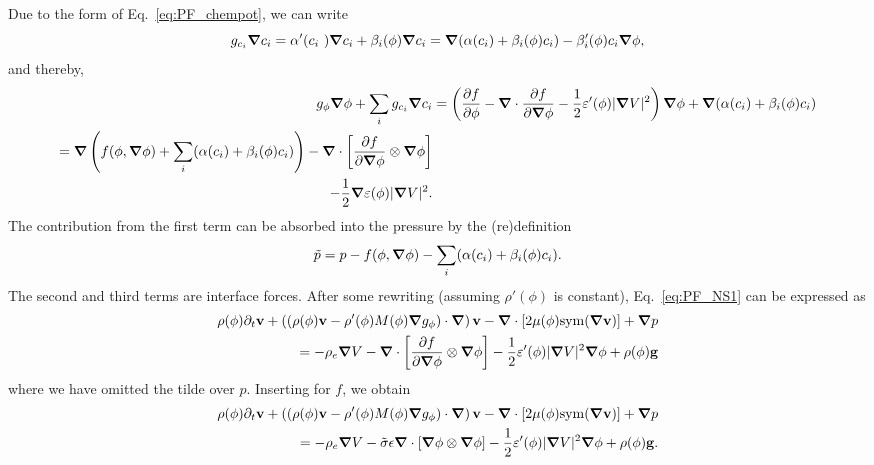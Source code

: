 \documentclass[preprint,pre,superscriptaddress,a4paper]{revtex4-1}
\renewcommand{\v}[1]{\ensuremath{\mathbf{#1}}} %
\newcommand{\gv}[1]{\ensuremath{\mbox{\boldmath$ #1 $}}}
\newcommand{\pd}[2]{\frac{\partial #1}{\partial #2}}
\newcommand{\grad}[1]{\gv{\nabla} #1} %
\renewcommand{\div}[1]{\gv{\nabla} \cdot #1} %
\newcommand{\pdt}[1]{\partial_t #1}
\newcommand{\sym}[1]{\mathrm{sym} #1 }
\begin{document}
Due to the form of Eq.~\eqref{eq:PF_chempot}, we can write
\begin{equation}
  g_{c_i} \grad c_i = \alpha'(c_i )\grad c_i + \beta_i (\phi) \grad c_i = \grad ( \alpha(c_i) + \beta_i(\phi) c_i) - \beta_i'(\phi) c_i \grad \phi,
\end{equation}
and thereby,
\begin{align}
  g_\phi \grad \phi + \sum_i g_{c_i} \grad c_i &= \left( \pd f \phi - \div \pd f {\grad \phi} - \frac 1 2 \varepsilon'(\phi) | \grad V |^2\right) \grad \phi + \grad ( \alpha(c_i) + \beta_i(\phi) c_i) \\
                                               \begin{split} = \grad \left( f(\phi, \grad \phi) + \sum_i ( \alpha(c_i) + \beta_i(\phi) c_i) \right) - \div \left[ \pd f {\grad \phi} \otimes \grad \phi \right] \\ - \frac 1 2 \grad \varepsilon(\phi) | \grad V |^2.
                                                 \end{split}
\end{align}
The contribution from the first term can be absorbed into the pressure by the (re)definition
\begin{equation}
  \tilde p = p - f(\phi, \grad \phi) - \sum_i ( \alpha(c_i) + \beta_i(\phi) c_i ) .
\end{equation}
The second and third terms are interface forces.
After some rewriting (assuming $\rho'(\phi)$ is constant), Eq.~\eqref{eq:PF_NS1} can be expressed as
\begin{equation}
  \begin{split}
    \rho(\phi) \pdt \v v + \left( \left(\rho(\phi) \v v - \rho'(\phi) M(\phi) \grad g_\phi  \right) \cdot \grad \right) \v v -
    \div \left[ 2 \mu(\phi) \sym (\grad \v v) \right] + \grad p \\
    = - \rho_e \grad V - \div \left[ \pd f {\grad \phi} \otimes \grad \phi \right]  - \frac 1 2 \varepsilon'(\phi) | \grad V |^2 \grad \phi + \rho(\phi) \v g
  \end{split}
\end{equation}
where we have omitted the tilde over $p$. Inserting for $f$, we obtain
\begin{equation}
  \begin{split}
    \rho(\phi) \pdt \v v + \left( \left(\rho(\phi) \v v - \rho'(\phi) M(\phi) \grad g_\phi  \right) \cdot \grad \right) \v v -
    \div \left[ 2 \mu(\phi) \sym (\grad \v v) \right] + \grad p \\
    = - \rho_e \grad V - \tilde \sigma \epsilon\div \left[ \grad \phi \otimes \grad \phi \right]  - \frac 1 2 \varepsilon'(\phi) | \grad V |^2 \grad \phi + \rho(\phi) \v g .
  \end{split}
\end{equation}
\end{document}
